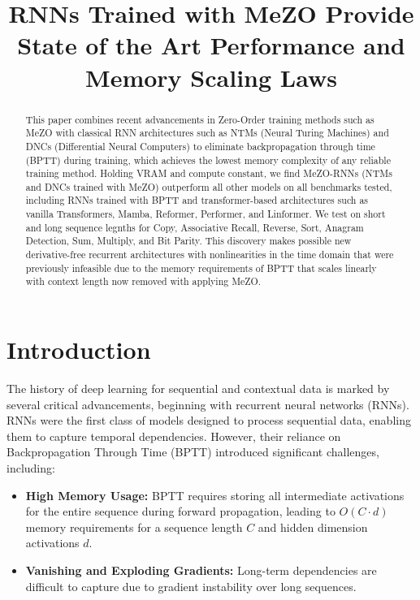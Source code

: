 \documentclass{article}
\begin{document}
\title{RNNs Trained with MeZO Provide State of the Art Performance and Memory Scaling Laws}
\author{}
\date{}
\maketitle

\begin{abstract}
This paper combines recent advancements in Zero-Order training methods such as MeZO with classical RNN architectures such as NTMs (Neural Turing Machines) and DNCs (Differential Neural Computers) to eliminate backpropagation through time (BPTT) during training, which achieves the lowest memory complexity of any reliable training method. Holding VRAM and compute constant, we find MeZO-RNNs (NTMs and DNCs trained with MeZO) outperform all other models on all benchmarks tested, including RNNs trained with BPTT and transformer-based architectures such as vanilla Transformers, Mamba, Reformer, Performer, and Linformer. We test on short and long sequence legnths for Copy, Associative Recall, Reverse, Sort, Anagram Detection, Sum, Multiply, and Bit Parity. This discovery makes possible new derivative-free recurrent architectures with nonlinearities in the time domain that were previously infeasible due to the memory requirements of BPTT that scales linearly with context length now removed with applying MeZO.
\end{abstract}

\section{Introduction}


The history of deep learning for sequential and contextual data is marked by several critical advancements, beginning with recurrent neural networks (RNNs). RNNs were the first class of models designed to process sequential data, enabling them to capture temporal dependencies. However, their reliance on Backpropagation Through Time (BPTT) introduced significant challenges, including:
\begin{itemize}
    \item \textbf{High Memory Usage:} BPTT requires storing all intermediate activations for the entire sequence during forward propagation, leading to $O(C \cdot d)$ memory requirements for a sequence length $C$ and hidden dimension activations $d$.
    \item \textbf{Vanishing and Exploding Gradients:} Long-term dependencies are difficult to capture due to gradient instability over long sequences.
\end{itemize}
\end{document}
